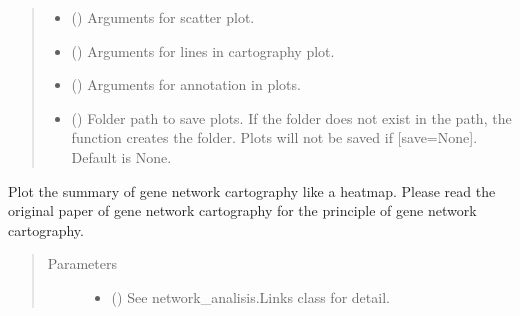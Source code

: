 \documentclass[letterpaper,10pt,english]{sphinxmanual}
\begin{document}
\begin{fulllineitems}
\begin{fulllineitems}
\begin{quote}
\begin{description}
\begin{itemize}
\item {} 
 () \textendash{} Arguments for scatter plot.

\item {} 
 () \textendash{} Arguments for lines in cartography plot.

\item {} 
 () \textendash{} Arguments for annotation in plots.

\item {} 
 () \textendash{} Folder path to save plots. If the folder does not exist in the path, the function creates the folder.
Plots will not be saved if {[}save=None{]}. Default is None.

\end{itemize}

\end{description}\end{quote}

\end{fulllineitems}


\begin{fulllineitems}
\label{\detokenize{modules/celloracle:celloracle.Links.plot_cartography_term}}
Plot the summary of gene network cartography like a heatmap.
Please read the original paper of gene network cartography for the principle of gene network cartography.
\begin{quote}\begin{description}
\item[{Parameters}] \leavevmode\begin{itemize}
\item {} 
 ({\hyperref[\detokenize{modules/celloracle:celloracle.Links}]{}}) \textendash{} See network\_analisis.Links class for detail.


\end{itemize}
\end{description}
\end{quote}
\end{fulllineitems}
\end{fulllineitems}
\end{document}
